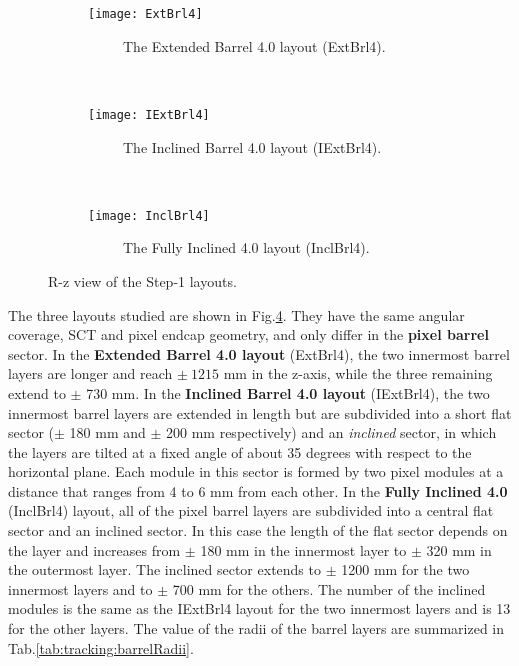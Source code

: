 \documentclass[a4paper,twoside,12pt]{book}
\begin{document}
\begin{figure}
\captionsetup[subfigure]{justification=centering}
\begin{subfigure}{\linewidth}
\centering
\texttt{[image: ExtBrl4]}
\caption{\ \ \ \ \ The Extended Barrel 4.0 layout (ExtBrl4).}
\label{fig:tracking:ExtBrl4}
\end{subfigure}\\[1ex]
\begin{subfigure}{\linewidth}
\centering
\texttt{[image: IExtBrl4]}
\caption{\ \ \ \ \ The Inclined Barrel 4.0 layout (IExtBrl4).}
\label{fig:tracking:IExtBrl4}
\end{subfigure}\\[1ex]
\begin{subfigure}{\linewidth}
\centering
\texttt{[image: InclBrl4]}
\caption{\ \ \ \ \ The Fully Inclined 4.0 layout (InclBrl4).}
\label{fig:tracking:InclBrl4}
\end{subfigure}
\caption{R-z view of the Step-1 layouts.}
\label{fig:tracking:layouts}
\end{figure}


The three layouts studied are shown in Fig.\ref{fig:tracking:layouts}. They have the same angular coverage, SCT and pixel endcap geometry, and only differ in the \textbf{pixel barrel} sector.
In the \textbf{Extended Barrel 4.0 layout} (ExtBrl4), the two innermost barrel layers are longer and
reach $\pm\ 1215$ mm in the z-axis, while the three remaining extend to $\pm$ 730 mm.
In the \textbf{Inclined Barrel 4.0 layout} (IExtBrl4), the two innermost barrel layers
are extended in length but are subdivided into a short flat sector ($\pm$ 180 mm and $\pm$ 200 mm respectively) and 
 an \textit{inclined} sector, in which the layers are tilted at a fixed angle of about 35 degrees with respect to the horizontal plane.
Each module in this sector is formed by two pixel modules at a distance that ranges from 4 to 6 mm from each other. In the \textbf{Fully Inclined 4.0} (InclBrl4) layout,
all of the pixel barrel layers are subdivided into a central flat sector and an inclined sector. In this case the length of the flat sector depends
on the layer and increases from $\pm$ 180 mm in the innermost layer to $\pm$ 320 mm in the outermost layer. The inclined sector extends
to $\pm$ 1200 mm for the two innermost layers and to $\pm$ 700 mm for the others. The number of the inclined modules is the same as the IExtBrl4 layout for the two innermost
layers and is 13 for the other layers. The value of the radii of the barrel layers are summarized in 
Tab.\ref{tab:tracking:barrelRadii}. \\
\end{document}
